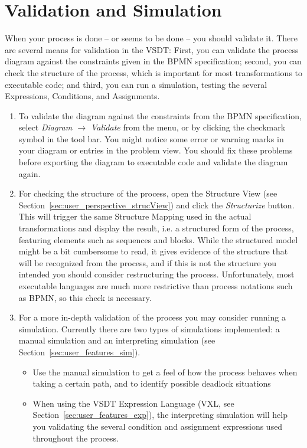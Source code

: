 \section{Validation and Simulation}
\label{sec:user_tut_validation}

When your process is done -- or seems to be done -- you should validate it. There are several means
for validation in the VSDT: First, you can validate the process diagram against the constraints
given in the BPMN specification; second, you can check the structure of the process, which is
important for most transformations to executable code; and third, you can run a simulation, testing
the several Expressions, Conditions, and Assignments.

\begin{enumerate}

	\item To validate the diagram against the constraints from the BPMN specification, select
	\emph{Diagram $\rightarrow$ Validate} from the menu, or by clicking the checkmark symbol in the
	tool bar. You might notice some error or warning marks in your diagram or entries in the problem
	view. You should fix these problems before exporting the diagram to executable code and validate
	the diagram again.
	
	\item For checking the structure of the process, open the Structure View (see
	Section~\ref{sec:user_perspective_strucView}) and click the \emph{Structurize} button. This will
	trigger the same Structure Mapping used in the actual transformations and display the result,
	i.e. a structured form of the process, featuring elements such as sequences and blocks. While
	the structured model might be a bit cumbersome to read, it gives evidence of the structure that
	will be recognized from the process, and if this is not the structure you intended you should
	consider restructuring the process. Unfortunately, most executable languages are much more
	restrictive than process notations such as BPMN, so this check is necessary.
	
	\item For a more in-depth validation of the process you may consider running a simulation.
	Currently there are two types of simulations implemented: a manual simulation and an
	interpreting simulation (see Section~\ref{sec:user_features_sim}).
	\begin{itemize}
		\item Use the manual simulation to get a feel of how the process behaves when taking a
		certain path, and to identify possible deadlock situations
		\item When using the VSDT Expression Language (VXL, see
		Section~\ref{sec:user_features_exp}), the interpreting simulation will help you validating
		the several condition and assignment expressions used throughout the process.
	\end{itemize}

\end{enumerate}


